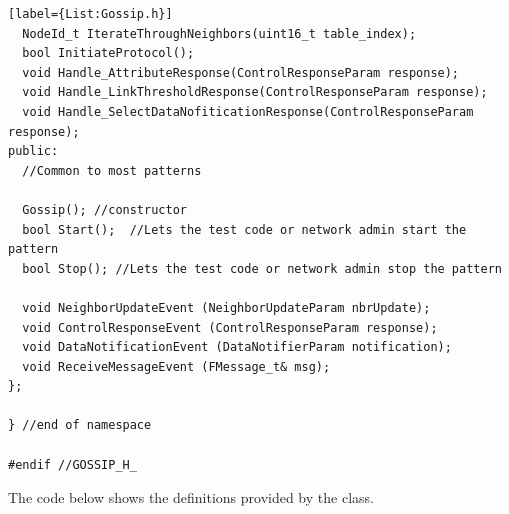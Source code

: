\begin{lstlisting}[style=boralargefile][label={List:Gossip.h}]
  NodeId_t IterateThroughNeighbors(uint16_t table_index);
  bool InitiateProtocol();
  void Handle_AttributeResponse(ControlResponseParam response);
  void Handle_LinkThresholdResponse(ControlResponseParam response);
  void Handle_SelectDataNofiticationResponse(ControlResponseParam response);
public:
  //Common to most patterns

  Gossip();	//constructor
  bool Start();  //Lets the test code or network admin start the pattern
  bool Stop(); //Lets the test code or network admin stop the pattern
  
  void NeighborUpdateEvent (NeighborUpdateParam nbrUpdate);
  void ControlResponseEvent (ControlResponseParam response);
  void DataNotificationEvent (DataNotifierParam notification);
  void ReceiveMessageEvent (FMessage_t& msg);
};

} //end of namespace

#endif //GOSSIP_H_
\end{lstlisting}
\label{List:Gossip.h}

The code below shows the definitions provided by the   class.  

